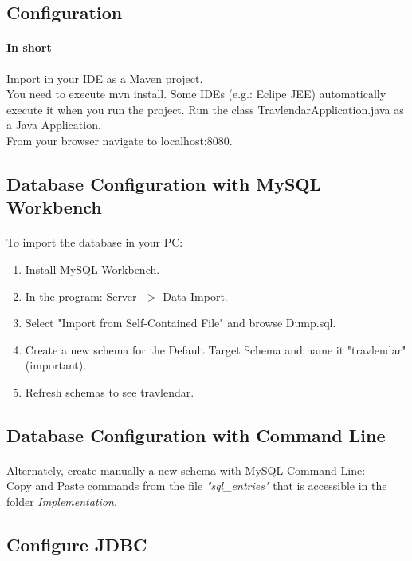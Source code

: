 \documentclass{article}
\begin{document}
		\subsection{Configuration}
		\paragraph{In short\\}Import in your IDE as a Maven project. \\You need to execute mvn install. Some IDEs (e.g.: Eclipe JEE) automatically execute it when you run the project.
Run the class TravlendarApplication.java as a Java Application.\\From your browser navigate to localhost:8080.
		\subsection{Database Configuration with MySQL Workbench}
		\paragraph{}To import the database in your PC:
		\begin{enumerate}
			\item Install MySQL Workbench.
			\item In the program: Server -$>$ Data Import.
			\item Select "Import from Self-Contained File" and browse Dump.sql.
			\item Create a new schema for the Default Target Schema and name it "travlendar" (important).
			\item Refresh schemas to see travlendar.
		\end{enumerate}
		\subsection{Database Configuration with Command Line}
		\paragraph{}Alternately, create manually a new schema with MySQL Command Line:\\Copy and Paste commands from the file \textit{"sql\_entries"} that is accessible in the folder \textit{Implementation}.
		\subsection{Configure JDBC}
\end{document}
